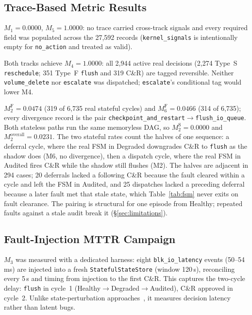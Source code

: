 \documentclass[conference]{IEEEtran}
\begin{document}
\subsection{Trace-Based Metric Results}

$M_1 = 0.0000$, $M_5 = 1.0000$: no trace carried cross-track signals and every required field was populated across the 27,592 records (\texttt{kernel\_signals} is intentionally empty for \texttt{no\_action} and treated as valid).

Both tracks achieve $M_4 = 1.0000$: all 2,944 active real decisions (2,274 Type~S \texttt{reschedule}; 351 Type~F \texttt{flush} and 319 C\&R) are tagged reversible. Neither \texttt{volume\_delete} nor \texttt{escalate} was dispatched; \texttt{escalate}'s conditional tag would lower M4.

$M_2^\mathrm{F} = 0.0474$ (319 of 6,735 real stateful cycles) and $M_6^\mathrm{F} = 0.0466$ (314 of 6,735); every divergence record is the pair \texttt{checkpoint\_and\_restart}$\rightarrow$\texttt{flush\_io\_queue}. Both stateless paths run the same memoryless DAG, so $M_2^\mathrm{S} = 0.0000$ and $M_2^\mathrm{overall} = 0.0231$. The two stateful rates count the halves of one sequence: a deferral cycle, where the real FSM in Degraded downgrades C\&R to \texttt{flush} as the shadow does (M6, no divergence), then a dispatch cycle, where the real FSM in Audited fires C\&R while the shadow still flushes (M2). The halves are adjacent in 294 cases; 20 deferrals lacked a following C\&R because the fault cleared within a cycle and left the FSM in Audited, and 25 dispatches lacked a preceding deferral because a later fault met that stale state, which Table~\ref{tab:fsm} never exits on fault clearance. The pairing is structural for one episode from Healthy; repeated faults against a stale audit break it (\S\ref{sec:limitations}).

\subsection{Fault-Injection MTTR Campaign}
\label{sec:m3}

$M_3$ was measured with a dedicated harness: eight \texttt{blk\_io\_latency} events (50--54\,ms) are injected into a fresh \texttt{StatefulStateStore} (window 120\,s), reconciling every 5\,s and timing from injection to the first C\&R. This captures the two-cycle delay: \texttt{flush} in cycle~1 (Healthy$\rightarrow$Degraded$\rightarrow$Audited), C\&R approved in cycle~2. Unlike state-perturbation approaches~\cite{b12}, it measures decision latency rather than latent bugs.
\end{document}
